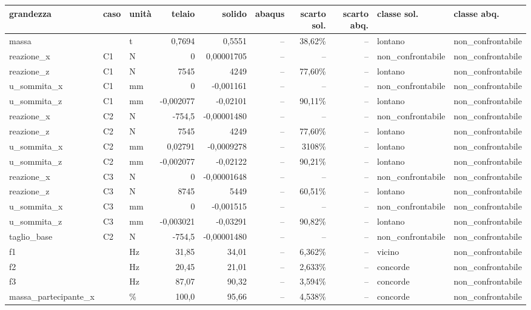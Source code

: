 \begin{table}
\centering
\begin{tabular}{lllrrrrrll}
\toprule
grandezza & caso & unit\`a & telaio & solido & abaqus & scarto sol. & scarto abq. & classe sol. & classe abq. \\
\midrule
massa &  & t & 0,7694 & 0,5551 & -- & 38,62\% & -- & lontano & non\_confrontabile \\
reazione\_x & C1 & N & 0 & 0,00001705 & -- & -- & -- & non\_confrontabile & non\_confrontabile \\
reazione\_z & C1 & N & 7545 & 4249 & -- & 77,60\% & -- & lontano & non\_confrontabile \\
u\_sommita\_x & C1 & mm & 0 & -0,001161 & -- & -- & -- & non\_confrontabile & non\_confrontabile \\
u\_sommita\_z & C1 & mm & -0,002077 & -0,02101 & -- & 90,11\% & -- & lontano & non\_confrontabile \\
reazione\_x & C2 & N & -754,5 & -0,00001480 & -- & -- & -- & non\_confrontabile & non\_confrontabile \\
reazione\_z & C2 & N & 7545 & 4249 & -- & 77,60\% & -- & lontano & non\_confrontabile \\
u\_sommita\_x & C2 & mm & 0,02791 & -0,0009278 & -- & 3108\% & -- & lontano & non\_confrontabile \\
u\_sommita\_z & C2 & mm & -0,002077 & -0,02122 & -- & 90,21\% & -- & lontano & non\_confrontabile \\
reazione\_x & C3 & N & 0 & -0,00001648 & -- & -- & -- & non\_confrontabile & non\_confrontabile \\
reazione\_z & C3 & N & 8745 & 5449 & -- & 60,51\% & -- & lontano & non\_confrontabile \\
u\_sommita\_x & C3 & mm & 0 & -0,001515 & -- & -- & -- & non\_confrontabile & non\_confrontabile \\
u\_sommita\_z & C3 & mm & -0,003021 & -0,03291 & -- & 90,82\% & -- & lontano & non\_confrontabile \\
taglio\_base & C2 & N & -754,5 & -0,00001480 & -- & -- & -- & non\_confrontabile & non\_confrontabile \\
f1 &  & Hz & 31,85 & 34,01 & -- & 6,362\% & -- & vicino & non\_confrontabile \\
f2 &  & Hz & 20,45 & 21,01 & -- & 2,633\% & -- & concorde & non\_confrontabile \\
f3 &  & Hz & 87,07 & 90,32 & -- & 3,594\% & -- & concorde & non\_confrontabile \\
massa\_partecipante\_x &  & \% & 100,0 & 95,66 & -- & 4,538\% & -- & concorde & non\_confrontabile \\

\end{tabular}
\end{table}
